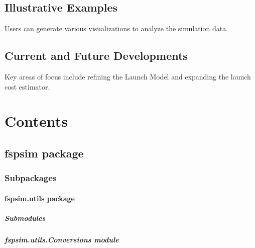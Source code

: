 \documentclass[letterpaper,10pt,english]{sphinxmanual}
\begin{document}
\section{Illustrative Examples}
\label{\detokenize{index:illustrative-examples}}
\sphinxAtStartPar
Users can generate various visualizations to analyze the simulation data.

\begin{figure}[htbp]
\centering

\noindent{}
\end{figure}


\section{Current and Future Developments}
\label{\detokenize{index:current-and-future-developments}}
\sphinxAtStartPar
Key areas of focus include refining the Launch Model and expanding the launch cost estimator.


\chapter{Contents}
\label{\detokenize{index:contents}}
\sphinxstepscope


\section{fspsim package}
\label{\detokenize{fspsim:fspsim-package}}\label{\detokenize{fspsim::doc}}

\subsection{Subpackages}
\label{\detokenize{fspsim:subpackages}}
\sphinxstepscope


\subsubsection{fspsim.utils package}
\label{\detokenize{fspsim.utils:fspsim-utils-package}}\label{\detokenize{fspsim.utils::doc}}

\paragraph{Submodules}
\label{\detokenize{fspsim.utils:submodules}}

\paragraph{fspsim.utils.Conversions module}
\label{\detokenize{fspsim.utils:module-fspsim.utils.Conversions}}\label{\detokenize{fspsim.utils:fspsim-utils-conversions-module}}
\end{document}
